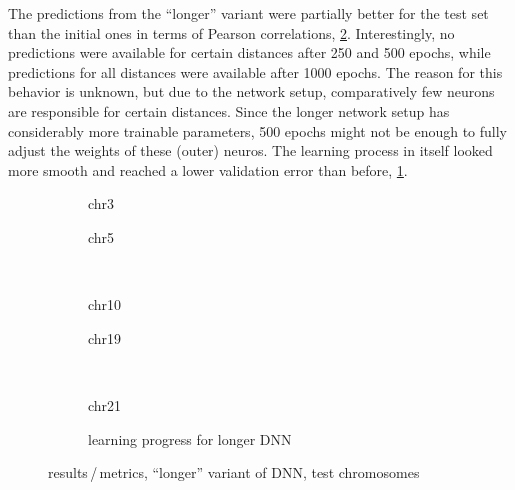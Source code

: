 The predictions from the ``longer'' variant were partially better for the test set than the initial ones in terms of
Pearson correlations, \cref{fig:results:longerDNN_pearson}.
Interestingly, no predictions were available for certain distances after 250 and 500 epochs, 
while predictions for all distances were available after 1000 epochs.
The reason for this behavior is unknown, but due to the network setup, 
comparatively few neurons are responsible for certain distances.
Since the longer network setup has considerably more trainable parameters,
500 epochs might not be enough to fully adjust the weights of these (outer) neuros.
The learning process in itself looked more smooth and reached a lower validation error than before, \cref{fig:results:longerDNN_lossEpochs}.
\begin{figure}[p]
    \begin{subfigure}{0.45\textwidth}
        \scriptsize
        \caption{chr3}
    \end{subfigure} \hfill
    \begin{subfigure}{0.45\textwidth}
        \scriptsize
        \caption{chr5}
    \end{subfigure}\\[5mm]
    \begin{subfigure}{0.45\textwidth}
        \scriptsize
        \caption{chr10}
    \end{subfigure}\hfill
    \begin{subfigure}{0.45\textwidth}
        \scriptsize
        \caption{chr19}
    \end{subfigure}\\[3mm]
    \centering
    \begin{subfigure}{0.45\textwidth}
        \scriptsize
        \caption{chr21}
    \end{subfigure}\hfill
    \begin{subfigure}{0.45\textwidth}
        \caption{learning progress for longer DNN} \label{fig:results:longerDNN_lossEpochs}
    \end{subfigure}
    \caption{results\,/\,metrics, ``longer'' variant of DNN,  test chromosomes}
    \label{fig:results:longerDNN_pearson}
\end{figure}

